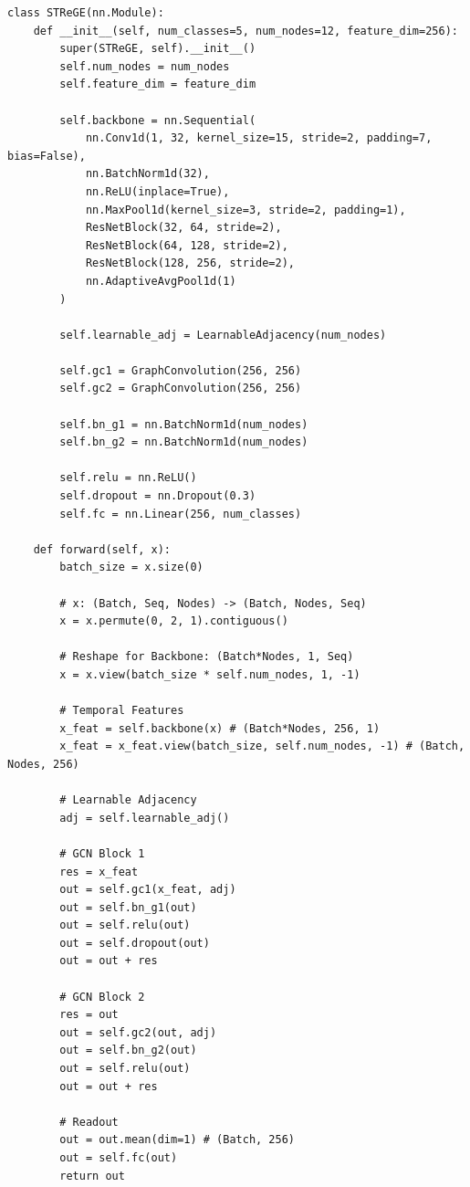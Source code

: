 \documentclass[12pt,a4paper]{report}
\begin{document}
\begin{lstlisting}[caption={Spatio-Temporal Graph Network (ST-ReGE) (src/models/gnn.py)}]
class STReGE(nn.Module):
    def __init__(self, num_classes=5, num_nodes=12, feature_dim=256):
        super(STReGE, self).__init__()
        self.num_nodes = num_nodes
        self.feature_dim = feature_dim
        
        self.backbone = nn.Sequential(
            nn.Conv1d(1, 32, kernel_size=15, stride=2, padding=7, bias=False),
            nn.BatchNorm1d(32),
            nn.ReLU(inplace=True),
            nn.MaxPool1d(kernel_size=3, stride=2, padding=1),
            ResNetBlock(32, 64, stride=2),
            ResNetBlock(64, 128, stride=2),
            ResNetBlock(128, 256, stride=2),
            nn.AdaptiveAvgPool1d(1)
        )
        
        self.learnable_adj = LearnableAdjacency(num_nodes)
        
        self.gc1 = GraphConvolution(256, 256)
        self.gc2 = GraphConvolution(256, 256)
        
        self.bn_g1 = nn.BatchNorm1d(num_nodes)
        self.bn_g2 = nn.BatchNorm1d(num_nodes)
        
        self.relu = nn.ReLU()
        self.dropout = nn.Dropout(0.3)
        self.fc = nn.Linear(256, num_classes)

    def forward(self, x):
        batch_size = x.size(0)
        
        # x: (Batch, Seq, Nodes) -> (Batch, Nodes, Seq)
        x = x.permute(0, 2, 1).contiguous() 
        
        # Reshape for Backbone: (Batch*Nodes, 1, Seq)
        x = x.view(batch_size * self.num_nodes, 1, -1)
        
        # Temporal Features
        x_feat = self.backbone(x) # (Batch*Nodes, 256, 1)
        x_feat = x_feat.view(batch_size, self.num_nodes, -1) # (Batch, Nodes, 256)
        
        # Learnable Adjacency
        adj = self.learnable_adj()
        
        # GCN Block 1
        res = x_feat
        out = self.gc1(x_feat, adj)
        out = self.bn_g1(out)
        out = self.relu(out)
        out = self.dropout(out)
        out = out + res 
        
        # GCN Block 2
        res = out
        out = self.gc2(out, adj)
        out = self.bn_g2(out)
        out = self.relu(out)
        out = out + res 
        
        # Readout
        out = out.mean(dim=1) # (Batch, 256)
        out = self.fc(out)
        return out
\end{lstlisting}
\end{document}
